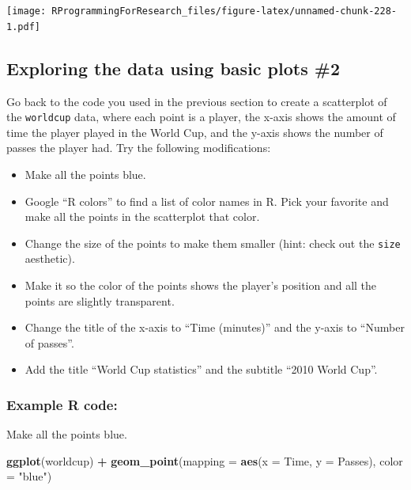 \documentclass[]{book}
\makeatletter
\newenvironment{Shaded}{\begin{snugshade}}{\end{snugshade}}
\newcommand{\KeywordTok}[1]{\textcolor[rgb]{0.13,0.29,0.53}{\textbf{#1}}}
\newcommand{\DataTypeTok}[1]{\textcolor[rgb]{0.13,0.29,0.53}{#1}}
\newcommand{\StringTok}[1]{\textcolor[rgb]{0.31,0.60,0.02}{#1}}
\newcommand{\OperatorTok}[1]{\textcolor[rgb]{0.81,0.36,0.00}{\textbf{#1}}}
\newcommand{\NormalTok}[1]{#1}
\providecommand{\tightlist}{%
  \setlength{\itemsep}{0pt}\setlength{\parskip}{0pt}}
\newenvironment{kframe}{%
\medskip{}
\setlength{\fboxsep}{.8em}
 \def\at@end@of@kframe{}%
 \ifinner\ifhmode%
  \def\at@end@of@kframe{\end{minipage}}%
  \begin{minipage}{\columnwidth}%
 \fi\fi%
 \def\FrameCommand##1{\hskip\@totalleftmargin \hskip-\fboxsep
 \colorbox{shadecolor}{##1}\hskip-\fboxsep
     \hskip-\linewidth \hskip-\@totalleftmargin \hskip\columnwidth}%
 \MakeFramed {\advance\hsize-\width
   \@totalleftmargin\z@ \linewidth\hsize
   \@setminipage}}%
 {\par\unskip\endMakeFramed%
 \at@end@of@kframe}
\renewenvironment{Shaded}{\begin{kframe}}{\end{kframe}}
\theoremstyle{definition}
\theoremstyle{definition}
\theoremstyle{definition}
\theoremstyle{remark}
\makeatother
\begin{document}
\texttt{[image: RProgrammingForResearch\_files/figure-latex/unnamed-chunk-228-1.pdf]}

\subsection{Exploring the data using basic plots
\#2}\label{exploring-the-data-using-basic-plots-2}

Go back to the code you used in the previous section to create a
scatterplot of the \texttt{worldcup} data, where each point is a player,
the x-axis shows the amount of time the player played in the World Cup,
and the y-axis shows the number of passes the player had. Try the
following modifications:

\begin{itemize}
\tightlist
\item
  Make all the points blue.
\item
  Google ``R colors'' to find a list of color names in R. Pick your
  favorite and make all the points in the scatterplot that color.
\item
  Change the size of the points to make them smaller (hint: check out
  the \texttt{size} aesthetic).
\item
  Make it so the color of the points shows the player's position and all
  the points are slightly transparent.
\item
  Change the title of the x-axis to ``Time (minutes)'' and the y-axis to
  ``Number of passes''.
\item
  Add the title ``World Cup statistics'' and the subtitle ``2010 World
  Cup''.
\end{itemize}

\subsubsection{Example R code:}\label{example-r-code-4}

Make all the points blue.

\begin{Shaded}
\begin{Highlighting}[]
\KeywordTok{ggplot}\NormalTok{(worldcup) }\OperatorTok{+}\StringTok{ }
\StringTok{  }\KeywordTok{geom_point}\NormalTok{(}\DataTypeTok{mapping =} \KeywordTok{aes}\NormalTok{(}\DataTypeTok{x =}\NormalTok{ Time, }\DataTypeTok{y =}\NormalTok{ Passes),}
             \DataTypeTok{color =} \StringTok{"blue"}\NormalTok{)}
\end{Highlighting}
\end{Shaded}
\end{document}
